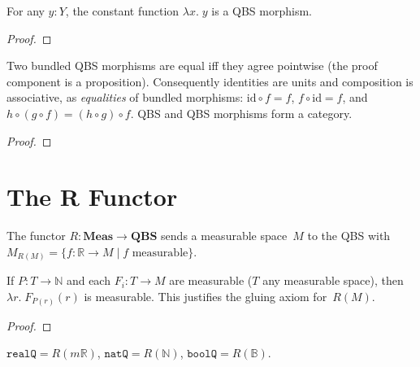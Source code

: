 \begin{lemma}\label{lem:qbs_morphism_const}
  \rocqok
  For any $y : Y$, the constant function $\lambda x.\; y$ is a QBS morphism.
\end{lemma}
\begin{proof}\rocqok\end{proof}

\begin{lemma}\label{lem:qbs_cat_laws}
  \rocqok
  Two bundled QBS morphisms are equal iff they agree pointwise
  (the proof component is a proposition).
  Consequently identities are units and composition is associative,
  as \emph{equalities} of bundled morphisms: $\mathrm{id} \circ f = f$,
  $f \circ \mathrm{id} = f$, and $h \circ (g \circ f) = (h \circ g) \circ f$.
  QBS and QBS morphisms form a category.
\end{lemma}
\begin{proof}\rocqok\end{proof}

\section{The R Functor}\label{sec:R_functor}

\begin{definition}[R Functor]\label{def:R_qbs}
  \rocqok
  The functor $R : \mathbf{Meas} \to \mathbf{QBS}$ sends a measurable
  space~$M$ to the QBS with
  $M_{R(M)} = \{f : \mathbb{R} \to M \mid f \text{ measurable}\}$.
\end{definition}

\begin{lemma}\label{lem:measurable_glue}
  \rocqok
  If $P : T \to \mathbb{N}$ and each $F_i : T \to M$
  are measurable ($T$ any measurable space), then $\lambda r.\; F_{P(r)}(r)$ is measurable.
  This justifies the gluing axiom for~$R(M)$.
\end{lemma}
\begin{proof}\rocqok\end{proof}

\begin{definition}\label{def:concrete_qbs}
  \rocqok
  $\mathtt{realQ} = R(m\mathbb{R})$, $\mathtt{natQ} = R(\mathbb{N})$,
  $\mathtt{boolQ} = R(\mathbb{B})$.
\end{definition}

